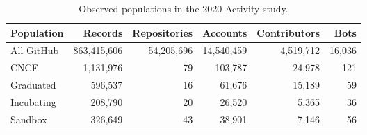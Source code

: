 \begin{table}[htbp]
\caption{Observed populations in the 2020 Activity study.}
\label{tab:ch4-population}
\centering
{\sffamily\fontsize{8.6}{11}\selectfont
\setlength{\tabcolsep}{4pt}
\begin{tabularx}{\linewidth}{@{}Xrrrrr@{}}
\toprule
Population & Records & Repositories & Accounts & Contributors & Bots\\
\midrule
All GitHub & 863,415,606 & 54,205,696 & 14,540,459 & 4,519,712 & 16,036\\
CNCF & 1,131,976 & 79 & 103,787 & 24,978 & 121\\
\quad Graduated & 596,537 & 16 & 61,676 & 15,189 & 59\\
\quad Incubating & 208,790 & 20 & 26,520 & 5,365 & 36\\
\quad Sandbox & 326,649 & 43 & 38,901 & 7,146 & 56\\
\bottomrule
\end{tabularx}}
\end{table}
